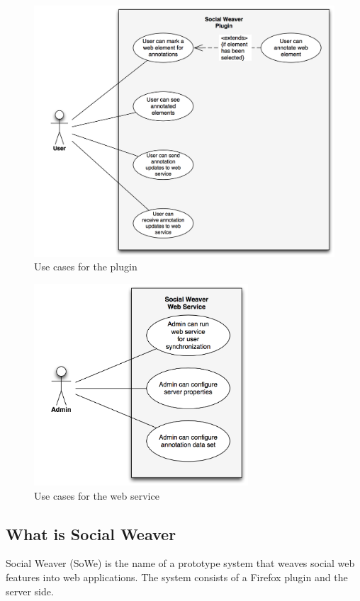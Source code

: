 \begin{figure} \centering
		\includegraphics[width=13cm]{images/plugin-usecase-diagram.png}
		\caption{Use cases for the plugin}
		\label{plugin-usecase-diagram}
\end{figure} 


\begin{figure}\centering
		\includegraphics[width=8cm]{images/server-usecase-diagram.png}
		\caption{Use cases for the web service}
		\label{server-usecase-diagram}
\end{figure} 

\newpage
\subsection{What is Social Weaver}\label{what_is_sowe}
Social Weaver (SoWe) is the name of a prototype system that weaves social web features into web applications. The system consists of a Firefox plugin and the server side.

